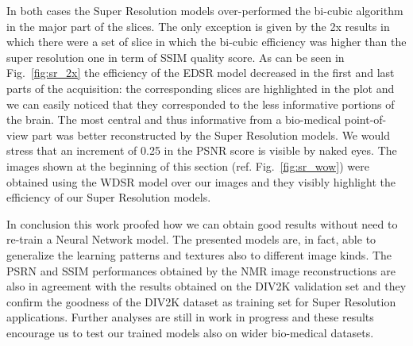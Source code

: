 \documentclass{standalone}
\begin{document}
In both cases the Super Resolution models over-performed the bi-cubic algorithm in the major part of the slices.
The only exception is given by the 2x results in which there were a set of slice in which the bi-cubic efficiency was higher than the super resolution one in term of SSIM quality score.
As can be seen in Fig.~\ref{fig:sr_2x} the efficiency of the EDSR model decreased in the first and last parts of the acquisition: the corresponding slices are highlighted in the plot and we can easily noticed that they corresponded to the less informative portions of the brain.
The most central and thus informative from a bio-medical point-of-view part was better reconstructed by the Super Resolution models.
We would stress that an increment of 0.25 in the PSNR score is visible by naked eyes.
The images shown at the beginning of this section (ref. Fig.~\ref{fig:sr_wow}) were obtained using the WDSR model over our images and they visibly highlight the efficiency of our Super Resolution models.

In conclusion this work proofed how we can obtain good results without need to re-train a Neural Network model.
The presented models are, in fact, able to generalize the learning patterns and textures also to different image kinds.
The PSRN and SSIM performances obtained by the NMR image reconstructions are also in agreement with the results obtained on the DIV2K validation set and they confirm the goodness of the DIV2K dataset as training set for Super Resolution applications.
Further analyses are still in work in progress and these results encourage us to test our trained models also on wider bio-medical datasets.
\end{document}

